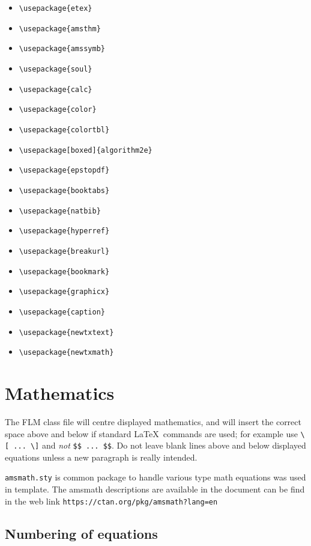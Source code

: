 \documentclass[lineno]{JFM-FLM_Au}
\begin{document}
\begin{itemize}
\item \verb"\usepackage{etex}"
\item \verb"\usepackage{amsthm}"
\item \verb"\usepackage{amssymb}"
\item \verb"\usepackage{soul}"
\item \verb"\usepackage{calc}"
\item \verb"\usepackage{color}"
\item \verb"\usepackage{colortbl}"
\item \verb"\usepackage[boxed]{algorithm2e}"
\item \verb"\usepackage{epstopdf}"
\item \verb"\usepackage{booktabs}"
\item \verb"\usepackage{natbib}"
\item \verb"\usepackage{hyperref}"
\item \verb"\usepackage{breakurl}"
\item \verb"\usepackage{bookmark}"
\item \verb"\usepackage{graphicx}"
\item \verb"\usepackage{caption}"
\item \verb"\usepackage{newtxtext}"
\item \verb"\usepackage{newtxmath}"
\end{itemize}

\section{Mathematics}

The FLM class file will centre displayed mathematics, and will insert the
correct space above and below if standard LaTeX\ commands are used; for
example use \verb"\[ ... \]" and \emph{not} \verb"$$ ... $$". Do not leave
blank lines above and below displayed equations unless a new paragraph is
really intended.

\verb"amsmath.sty" is common package to handle various type math equations was used in template. The amsmath descriptions are available in the document can be find in the web link \verb"https://ctan.org/pkg/amsmath?lang=en"

\subsection{Numbering of equations}
\end{document}
